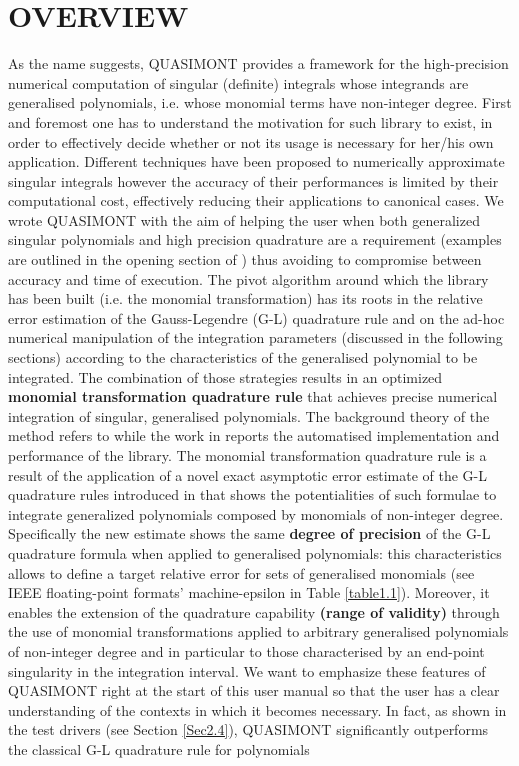 \documentclass[a4paper, twosided]{book}
\begin{document}
\section[Overview]{\changefont OVERVIEW}\label{Sec1.1}

\noindent
As the name suggests, QUASIMONT provides a framework for the high-precision numerical computation of singular (definite) integrals whose integrands are generalised polynomials, i.e. whose monomial terms have non-integer degree. First and foremost one has to understand the motivation for such library to exist, in order to effectively decide whether or not its usage is necessary for her/his own application. Different techniques have been proposed to numerically approximate singular integrals however the accuracy of their performances is limited by their computational cost, effectively reducing their applications to canonical cases. We wrote QUASIMONT with the aim of helping the user when both generalized singular polynomials and high precision quadrature are a requirement (examples are outlined in the opening section of \cite{Lombardi21}) thus avoiding to compromise between accuracy and time of execution. The pivot algorithm around which the library has been built (i.e. the monomial transformation) has its roots in the relative error estimation of the Gauss-Legendre (G-L) quadrature rule and on the ad-hoc numerical manipulation of the integration parameters (discussed in the following sections) according to the characteristics of the generalised polynomial to be integrated. The combination of those strategies results in an optimized \color{poliDarkBlue} \textbf{monomial transformation quadrature rule} \color{black} that achieves precise numerical integration of singular, generalised polynomials. The background theory of the method refers to \cite{Lombardi09} while the work in \cite{Lombardi21} reports the automatised implementation and performance of the library. The monomial transformation quadrature rule is a result of the application of a novel exact asymptotic error estimate of the G-L quadrature rules introduced in \cite{Lombardi09} that shows the potentialities of such formulae to integrate generalized polynomials composed by monomials of non-integer degree. Specifically the new estimate shows the same \color{poliDarkBlue} \textbf{degree of precision} \color{black} of the G-L quadrature formula when applied to generalised polynomials: this characteristics allows to define a  target relative error for sets of generalised monomials (see IEEE floating-point formats' machine-epsilon in Table \ref{table1.1}). Moreover, it enables the extension of the quadrature capability  \color{poliDarkBlue} \textbf{(range of validity)} \color{black} through the use of monomial transformations applied to arbitrary generalised polynomials of non-integer degree and in particular to those characterised by an end-point singularity in the integration interval. We want to emphasize these features of QUASIMONT right at the start of this user manual so that the user has a clear understanding of the contexts in which it becomes necessary. In fact, as shown in the test drivers (see Section \ref{Sec2.4}), QUASIMONT significantly outperforms the classical G-L quadrature rule for polynomials 
\end{document}
